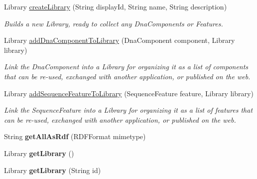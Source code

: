 \begin{DoxyCompactItemize}
Library \hyperlink{classorg_1_1sbolstandard_1_1rdf_1_1_sbol_service_a7a21049be3161d93bd273e6906899c5a}{createLibrary} (String displayId, String name, String description)
\begin{DoxyCompactList}\small\item\em Builds a new Library, ready to collect any DnaComponents or Features. \item\end{DoxyCompactList}\item 
Library \hyperlink{classorg_1_1sbolstandard_1_1rdf_1_1_sbol_service_a0f8d861cd85028c6a67c6480dc87d15e}{addDnaComponentToLibrary} (DnaComponent component, Library library)
\begin{DoxyCompactList}\small\item\em Link the DnaComponent into a Library for organizing it as a list of components that can be re-\/used, exchanged with another application, or published on the web. \item\end{DoxyCompactList}\item 
Library \hyperlink{classorg_1_1sbolstandard_1_1rdf_1_1_sbol_service_ae387ca46de01accf2c313559d3783d1c}{addSequenceFeatureToLibrary} (SequenceFeature feature, Library library)
\begin{DoxyCompactList}\small\item\em Link the SequenceFeature into a Library for organizing it as a list of features that can be re-\/used, exchanged with another application, or published on the web. \item\end{DoxyCompactList}\item 
\hypertarget{classorg_1_1sbolstandard_1_1rdf_1_1_sbol_service_a7a6cf1a457b3b0fb7d797ec49ccb9eed}{
String {\bfseries getAllAsRdf} (RDFFormat mimetype)}
\label{classorg_1_1sbolstandard_1_1rdf_1_1_sbol_service_a7a6cf1a457b3b0fb7d797ec49ccb9eed}

\item 
\hypertarget{classorg_1_1sbolstandard_1_1rdf_1_1_sbol_service_af9a5066e34e18516151efd1305082f71}{
Library {\bfseries getLibrary} ()}
\label{classorg_1_1sbolstandard_1_1rdf_1_1_sbol_service_af9a5066e34e18516151efd1305082f71}

\item 
\hypertarget{classorg_1_1sbolstandard_1_1rdf_1_1_sbol_service_ae514a61ce2bda5351f853390e77afab5}{
Library {\bfseries getLibrary} (String id)}
\label{classorg_1_1sbolstandard_1_1rdf_1_1_sbol_service_ae514a61ce2bda5351f853390e77afab5}


\end{DoxyCompactItemize}

